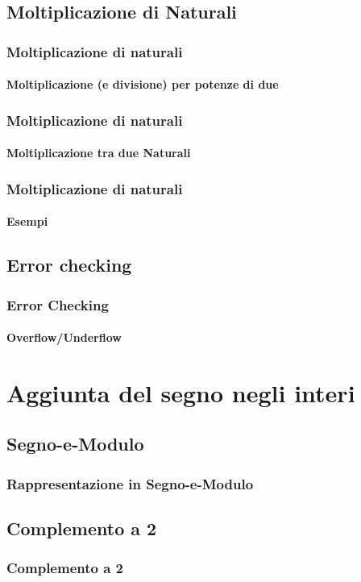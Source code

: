 \documentclass{beamer}
\begin{document}
	\subsection[NatMul]{Moltiplicazione di Naturali}  
	  \begin{frame}
	    \frametitle{Moltiplicazione di naturali}
	    \framesubtitle{Moltiplicazione (e divisione) per potenze di due}
	  \end{frame}
	  \begin{frame}
	    \frametitle{Moltiplicazione di naturali}
	    \framesubtitle{Moltiplicazione tra due Naturali}
	  \end{frame}
		\begin{frame}
	    \frametitle{Moltiplicazione di naturali}
	    \framesubtitle{Esempi}
	  \end{frame}
	\subsection[Errors]{Error checking}
		\begin{frame}
	    \frametitle{Error Checking}
	    \framesubtitle{Overflow/Underflow}
	  \end{frame}
  
  \section[NegativeRep]{Aggiunta del segno negli interi}
  \subsection{Segno-e-Modulo}
  \begin{frame}
    \frametitle{Rappresentazione in Segno-e-Modulo}
  \end{frame}
  \subsection{Complemento a 2}
  \begin{frame}
    \frametitle{Complemento a 2}
  \end{frame}
\end{document}
